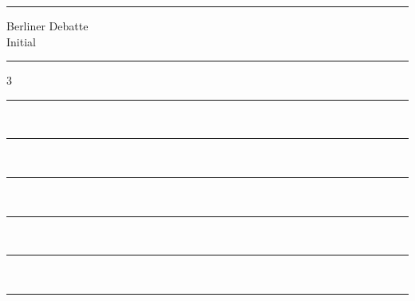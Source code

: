 
\begin{titlepage}
    \pagecolor{bdiwhite}
    \vspace*{-1.5cm}
    \hrule
    \begin{center}
        \vspace{10pt}
        {\bdilogo Berliner Debatte\\Initial\par}
        \vspace{10pt}
    \end{center}
    \hrule
    \begin{center}
        \vspace{20pt}
        {\bdinumber \color{bdired} 3}
        \vspace{10pt}
    \end{center}
    \par\noindent\rule{67mm}{0.4pt}\\
            {\bdivolume{\color{bdired} {33. Jg. 2022}}}
            \begin{center}
                \bdicover {\bfseries \bdiTitle}
            \end{center}
            \bigskip
            
            \hspace{67mm}\noindent\rule{67mm}{0.4pt}\\\bigskip
            \hfill{\bdivolume{\autorEins}}
            \begin{center}
                \bdicover \artikelEins
            \end{center}
            \bigskip

            \par\noindent\rule{67mm}{0.4pt}\\
            {\bdivolume{\autorZwei}}
            \begin{center}
                \bdicover \artikelZwei
            \end{center}
            \bigskip

            \hspace{67mm}\noindent\rule{67mm}{0.4pt}\\\bigskip
            \hfill{\bdivolume{\autorDrei}}
            \begin{center}
                \bdicover \artikelDrei
            \end{center}
            \bigskip

            \par\noindent\rule{67mm}{0.4pt}\\
            {\bdivolume{\autorVier}}
            \begin{center}
                \bdicover \artikelVier 
            \end{center}
            \bigskip

            \hspace{67mm}\noindent\rule{67mm}{0.4pt}\\\bigskip
            \hfill{\bdivolume{\autorFuenf}}
            \begin{center}
                \bdicover \artikelFuenf
            \end{center}
\end{titlepage}
\nopagecolor 
\restoregeometry